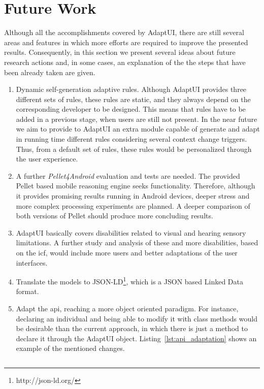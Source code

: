 \section{Future Work}
\label{sec:future_work}

Although all the accomplishments covered by AdaptUI, there are still several 
areas and features in which more efforts are required to improve the presented 
results. Consequently, in this section we present several ideas about future 
research actions and, in some cases, an explanation of the the steps that have 
been already taken are given.

\begin{enumerate}[label=\alph*)]
  \item Dynamic self-generation adaptive rules. Although AdaptUI provides three 
  different sets of rules, these rules are static, and they always depend on 
  the corresponding developer to be designed. This means that rules have to 
  be added in a previous stage, when users are still not present. In the near 
  future we aim to provide to AdaptUI an extra module capable of generate and 
  adapt in running time different rules considering several context change 
  triggers. Thus, from a default set of rules, these rules would be personalized 
  through the user experience.
  
  \item A further \textit{Pellet4Android} evaluation and tests are needed. The
  provided Pellet based mobile reasoning engine seeks functionality. Therefore,
  although it provides promising results running in Android devices, deeper 
  stress and  more complex processing experiments are planned. A deeper
  comparison of both versions of Pellet should produce more concluding results.
  
  \item AdaptUI basically covers disabilities related to visual and hearing
  sensory limitations. A further study and analysis of these and more 
  disabilities, based on the \ac{icf}, would include more users and better 
  adaptations of the user interfaces.
  
  \item Translate the models to JSON-LD\footnote{http://json-ld.org/}, which is
  a JSON based Linked Data format.
  
  \item Adapt the \ac{api}, reaching a more object oriented paradigm. For instance,
  declaring an individual and being able to modify it with class methods would 
  be desirable than the current approach, in which there is just a method to
  declare it through the AdaptUI object. Listing~\ref{lst:api_adaptation} shows
  an example of the mentioned changes.
  
  \inputminted[linenos=true, fontsize=\footnotesize, frame=lines]{java}{6_conclusion/api_adaptation.java}
\end{enumerate}
